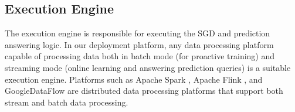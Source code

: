 \subsection{Execution Engine}
The execution engine is responsible for executing the SGD and prediction answering logic.
In our deployment platform, any data processing platform capable of processing data both in batch mode (for proactive training) and streaming mode (online learning and answering prediction queries) is a suitable execution engine.
Platforms such as Apache Spark \cite{zaharia2010spark}, Apache Flink \cite{carbone2015apache}, and GoogleDataFlow \cite{akidau2015dataflow} are distributed data processing platforms that support both stream and batch data processing.